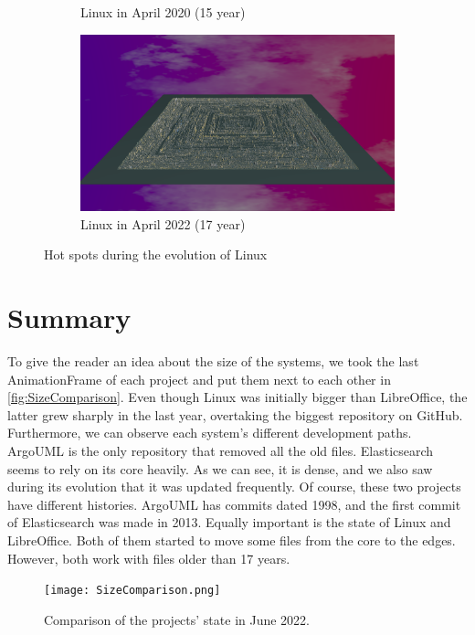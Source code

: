 \begin{figure}[ht]
\begin{subfigure}{0.48\textwidth}
        \caption{Linux in April 2020 (15 year)} 
        \label{fig:Linux_V7_S5}
    \end{subfigure}\hspace*{\fill}
    \begin{subfigure}{0.48\textwidth}
        \includegraphics[width=\linewidth]{Linux/Animation017.png}
        \caption{Linux in April 2022 (17 year)} 
        \label{fig:Linux_V7_S6}
    \end{subfigure}
    
    \caption{Hot spots during the evolution of Linux} 
    \label{fig:Linux_V7}
\end{figure}

\clearpage
\section{Summary}

To give the reader an idea about the size of the systems, we took the last AnimationFrame of each project and put them next to each other in \autoref{fig:SizeComparison}. Even though Linux was initially bigger than LibreOffice, the latter grew sharply in the last year, overtaking the biggest repository on GitHub. Furthermore, we can observe each system's different development paths. ArgoUML is the only repository that removed all the old files. Elasticsearch seems to rely on its core heavily. As we can see, it is dense, and we also saw during its evolution that it was updated frequently. Of course, these two projects have different histories. ArgoUML has commits dated 1998, and the first commit of Elasticsearch was made in 2013. Equally important is the state of Linux and LibreOffice. Both of them started to move some files from the core to the edges. However, both work with files older than 17 years. 

\begin{figure}[ht]
    \centering
    \texttt{[image: SizeComparison.png]}
    \caption{Comparison of the projects' state in June 2022.} 
    \label{fig:SizeComparison}
\end{figure}
